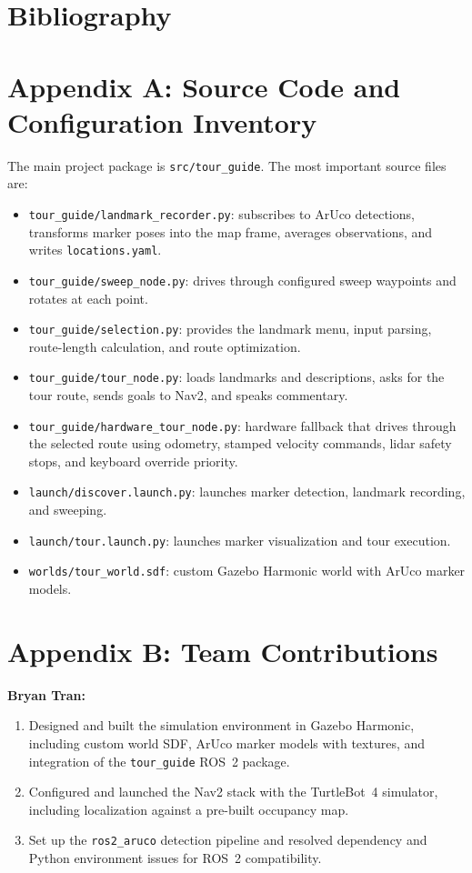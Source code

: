 \documentclass[12pt]{article}
\begin{document}
\section*{Bibliography}



\newpage
\section*{Appendix A: Source Code and Configuration Inventory}
The main project package is \texttt{src/tour\_guide}. The most important source files are:
\begin{itemize}
    \item \texttt{tour\_guide/landmark\_recorder.py}: subscribes to ArUco detections, transforms marker poses into the map frame, averages observations, and writes \texttt{locations.yaml}.
    \item \texttt{tour\_guide/sweep\_node.py}: drives through configured sweep waypoints and rotates at each point.
    \item \texttt{tour\_guide/selection.py}: provides the landmark menu, input parsing, route-length calculation, and route optimization.
    \item \texttt{tour\_guide/tour\_node.py}: loads landmarks and descriptions, asks for the tour route, sends goals to Nav2, and speaks commentary.
    \item \texttt{tour\_guide/hardware\_tour\_node.py}: hardware fallback that drives through the selected route using odometry, stamped velocity commands, lidar safety stops, and keyboard override priority.
    \item \texttt{launch/discover.launch.py}: launches marker detection, landmark recording, and sweeping.
    \item \texttt{launch/tour.launch.py}: launches marker visualization and tour execution.
    \item \texttt{worlds/tour\_world.sdf}: custom Gazebo Harmonic world with ArUco marker models.
\end{itemize}

\section*{Appendix B: Team Contributions}
\textbf{Bryan Tran:}
\begin{enumerate}
    \item Designed and built the simulation environment in Gazebo Harmonic, including custom world SDF, ArUco marker models with textures, and integration of the \texttt{tour\_guide} ROS~2 package.
    \item Configured and launched the Nav2 stack with the TurtleBot~4 simulator, including localization against a pre-built occupancy map.
    \item Set up the \texttt{ros2\_aruco} detection pipeline and resolved dependency and Python environment issues for ROS~2 compatibility.
\end{enumerate}
\end{document}
